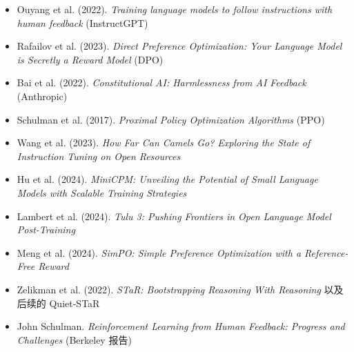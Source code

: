 \documentclass[a4paper]{article}
\begin{document}
\begin{itemize}
    \item Ouyang et al. (2022). \textit{Training language models to follow instructions with human feedback} (InstructGPT)
    \item Rafailov et al. (2023). \textit{Direct Preference Optimization: Your Language Model is Secretly a Reward Model} (DPO)
    \item Bai et al. (2022). \textit{Constitutional AI: Harmlessness from AI Feedback} (Anthropic)
    \item Schulman et al. (2017). \textit{Proximal Policy Optimization Algorithms} (PPO)
    \item Wang et al. (2023). \textit{How Far Can Camels Go? Exploring the State of Instruction Tuning on Open Resources}
    \item Hu et al. (2024). \textit{MiniCPM: Unveiling the Potential of Small Language Models with Scalable Training Strategies}
    \item Lambert et al. (2024). \textit{Tulu 3: Pushing Frontiers in Open Language Model Post-Training}
    \item Meng et al. (2024). \textit{SimPO: Simple Preference Optimization with a Reference-Free Reward}
    \item Zelikman et al. (2022). \textit{STaR: Bootstrapping Reasoning With Reasoning} 以及后续的 Quiet-STaR
    \item John Schulman. \textit{Reinforcement Learning from Human Feedback: Progress and Challenges} (Berkeley 报告)
\end{itemize}
\end{document}
